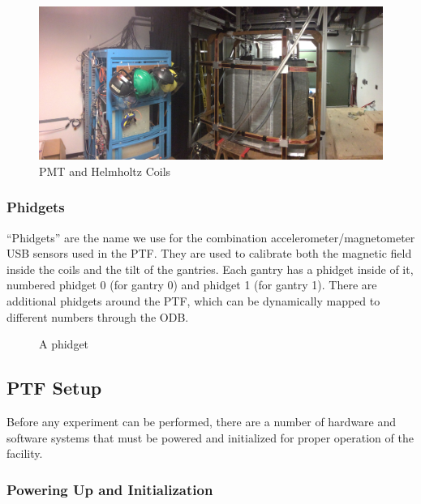 \documentclass[twoside,letterpaper]{refart}
\begin{document}
\begin{figure}[!htpb]\centering	
	\includegraphics[width=\textwidth]{images/panoPTF}
	\caption{PMT and Helmholtz Coils\label{fig:pmtAndCoils}}
\end{figure}

\FloatBarrier


\subsubsection{Phidgets}

``Phidgets'' are the name we use for the combination accelerometer/magnetometer USB sensors used in the PTF. They are used to calibrate both the magnetic field inside the coils and the tilt of the gantries. Each gantry has a phidget inside of it, numbered phidget 0 (for gantry 0) and phidget 1 (for gantry 1). There are additional phidgets around the PTF, which can be dynamically mapped to different numbers through the ODB.


\begin{figure}[!htpb]\centering
	\caption{A phidget\label{fig:phidget}}
\end{figure}


\clearpage


\subsection{PTF Setup}

Before any experiment can be performed, there are a number of hardware and software systems that must be powered and initialized for proper operation of the facility.

\subsubsection{Powering Up and Initialization}
\end{document}
